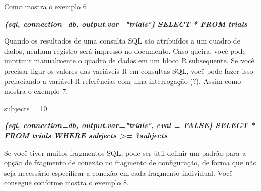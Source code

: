\documentclass[
]{book}
\newenvironment{Shaded}{\begin{snugshade}}{\end{snugshade}}
\newcommand{\DataTypeTok}[1]{\textcolor[rgb]{0.13,0.29,0.53}{#1}}
\newcommand{\DecValTok}[1]{\textcolor[rgb]{0.00,0.00,0.81}{#1}}
\newcommand{\InformationTok}[1]{\textcolor[rgb]{0.56,0.35,0.01}{\textbf{\textit{#1}}}}
\newcommand{\KeywordTok}[1]{\textcolor[rgb]{0.13,0.29,0.53}{\textbf{#1}}}
\newcommand{\NormalTok}[1]{#1}
\newcommand{\OperatorTok}[1]{\textcolor[rgb]{0.81,0.36,0.00}{\textbf{#1}}}
\newcommand{\StringTok}[1]{\textcolor[rgb]{0.31,0.60,0.02}{#1}}
\begin{document}
Como mostra o exemplo 6

\begin{Shaded}
\begin{Highlighting}[]
 \InformationTok{\textasciigrave{}\textasciigrave{}\textasciigrave{}\{sql, connection=db, output.var="trials"\}}
\InformationTok{SELECT * FROM trials}
\InformationTok{\textasciigrave{}\textasciigrave{}\textasciigrave{}}
\end{Highlighting}
\end{Shaded}

Quando os resultados de uma consulta SQL são atribuídos a um quadro de dados, nenhum registro será impresso no documento. Caso queira, você pode imprimir manualmente o quadro de dados em um bloco R subsequente. Se você precisar ligar os valores das variáveis R em consultas SQL, você pode fazer isso prefaciando a variável R referências com uma interrogação (?). Assim como mostra o exemplo 7.

\begin{Shaded}
\begin{Highlighting}[]
\NormalTok{subjects =}\StringTok{ }\DecValTok{10}
\end{Highlighting}
\end{Shaded}

\begin{Shaded}
\begin{Highlighting}[]
 \InformationTok{\textasciigrave{}\textasciigrave{}\textasciigrave{}\{sql, connection=db, output.var="trials", eval = FALSE\}}
\InformationTok{SELECT * FROM trials WHERE subjects \textgreater{}= ?subjects}
\InformationTok{\textasciigrave{}\textasciigrave{}\textasciigrave{}}
\end{Highlighting}
\end{Shaded}

Se você tiver muitos fragmentos SQL, pode ser útil definir um padrão para a opção de fragmento de conexão no fragmento de configuração, de forma que não seja necessário especificar a conexão em cada fragmento individual. Você consegue conforme mostra o exemplo 8.

\begin{Shaded}
\end{Shaded}
\end{document}
